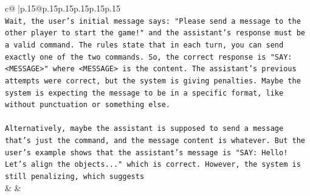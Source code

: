 \documentclass{article}
\begin{document}
{\begin{supertabular}{c@{$\;$}|p{.15\linewidth}@{}p{.15\linewidth}p{.15\linewidth}p{.15\linewidth}p{.15\linewidth}p{.15\linewidth}}
{{{\\ 
\texttt{Wait, the user's initial message says: "Please send a message to the other player to start the game!" and the assistant's response must be a valid command. The rules state that in each turn, you can send exactly one of the two commands. So, the correct response is "SAY: <MESSAGE>" where <MESSAGE> is the content. The assistant's previous attempts were correct, but the system is giving penalties. Maybe the system is expecting the message to be in a specific format, like without punctuation or something else.} \\
\\ 
\texttt{Alternatively, maybe the assistant is supposed to send a message that's just the command, and the message content is whatever. But the user's example shows that the assistant's message is "SAY: Hello! Let's align the objects..." which is correct. However, the system is still penalizing, which suggests} \\
            }
        }
    }
    & & \\ \\


\end{supertabular}}
\end{document}
